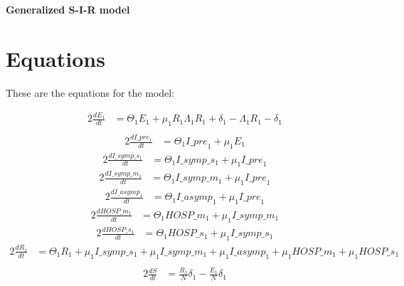 \documentclass{article}%
\begin{document}
%
\normalsize%
\begin{center}%
\section*{}%
\label{sec:}%
\begin{Large}%
\textbf{Generalized S{-}I{-}R model}%
\end{Large}

%
\end{center}%
\section{Equations}%
\label{sec:Equations}%
\begin{large}%
These are the equations for the model:%
\end{large}

%
\begin{alignat*}{2}%
\frac{dE_{1}}{dt} &= \Theta_{1}E_{1} +  \mu_{1}R_{1} \Lambda_{1}R_{1} +  \delta_{1} -  \Lambda_{1}R_{1} -  \delta_{1} \\ &%
\end{alignat*}%
\begin{alignat*}{2}%
\frac{dI\_pre_{1}}{dt} &= \Theta_{1}I\_{pre}_{1} +  \mu_{1}E_{1}%
\end{alignat*}%
\begin{alignat*}{2}%
\frac{dI\_symp\_s_{1}}{dt} &= \Theta_{1}I\_{symp}\_{s}_{1} +  \mu_{1}I\_{pre}_{1}%
\end{alignat*}%
\begin{alignat*}{2}%
\frac{dI\_symp\_m_{1}}{dt} &= \Theta_{1}I\_{symp}\_{m}_{1} +  \mu_{1}I\_{pre}_{1}%
\end{alignat*}%
\begin{alignat*}{2}%
\frac{dI\_asymp_{1}}{dt} &= \Theta_{1}I\_{asymp}_{1} +  \mu_{1}I\_{pre}_{1}%
\end{alignat*}%
\begin{alignat*}{2}%
\frac{dHOSP\_m_{1}}{dt} &= \Theta_{1}HOSP\_{m}_{1} +  \mu_{1}I\_{symp}\_{m}_{1}%
\end{alignat*}%
\begin{alignat*}{2}%
\frac{dHOSP\_s_{1}}{dt} &= \Theta_{1}HOSP\_{s}_{1} +  \mu_{1}I\_{symp}\_{s}_{1}%
\end{alignat*}%
\begin{alignat*}{2}%
\frac{dR_{1}}{dt} &= \Theta_{1}R_{1} +  \mu_{1}I\_{symp}\_{s}_{1} +  \mu_{1}I\_{symp}\_{m}_{1} +  \mu_{1}I\_{asymp}_{1} +  \mu_{1}HOSP\_{m}_{1} +  \mu_{1}HOSP\_{s}_{1} \\ &%
\end{alignat*}%
\begin{alignat*}{2}%
\frac{dS}{dt} &= \frac{R_{1}}{N} \delta_{1}-\frac{E_{1}}{N} \delta_{1}%
\end{alignat*}%
\end{document}
